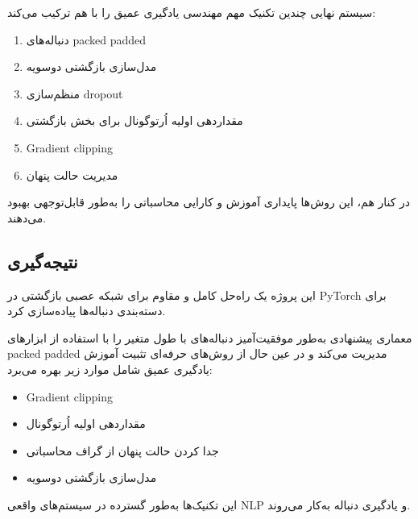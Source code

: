 \documentclass[12pt,a4paper]{article}
\begin{document}
سیستم نهایی چندین تکنیک مهم مهندسی یادگیری عمیق را با هم ترکیب می‌کند:

\begin{enumerate}
	\item دنباله‌های packed padded
	\item مدل‌سازی بازگشتی دو‌سویه
	\item منظم‌سازی dropout
	\item مقداردهی اولیه اُرتوگونال برای بخش بازگشتی
	\item Gradient clipping
	\item مدیریت حالت پنهان
\end{enumerate}

در کنار هم، این روش‌ها پایداری آموزش و کارایی محاسباتی را به‌طور قابل‌توجهی بهبود می‌دهند.

\subsection{نتیجه‌گیری}

\begin{tcolorbox}[colback=softpink,colframe=softred,title=\textbf{نتیجه‌گیری بخش 5}]
	این پروژه یک راه‌حل کامل و مقاوم برای شبکه عصبی بازگشتی در PyTorch برای دسته‌بندی دنباله‌ها پیاده‌سازی کرد.
	
	معماری پیشنهادی به‌طور موفقیت‌آمیز دنباله‌های با طول متغیر را با استفاده از ابزارهای packed padded مدیریت می‌کند و در عین حال از روش‌های حرفه‌ای تثبیت آموزش یادگیری عمیق شامل موارد زیر بهره می‌برد:
	
	\begin{itemize}
		\item Gradient clipping
		\item مقداردهی اولیه اُرتوگونال
		\item جدا کردن حالت پنهان از گراف محاسباتی
		\item مدل‌سازی بازگشتی دو‌سویه
	\end{itemize}
	
	این تکنیک‌ها به‌طور گسترده در سیستم‌های واقعی NLP و یادگیری دنباله به‌کار می‌روند.
\end{tcolorbox}
\end{document}
